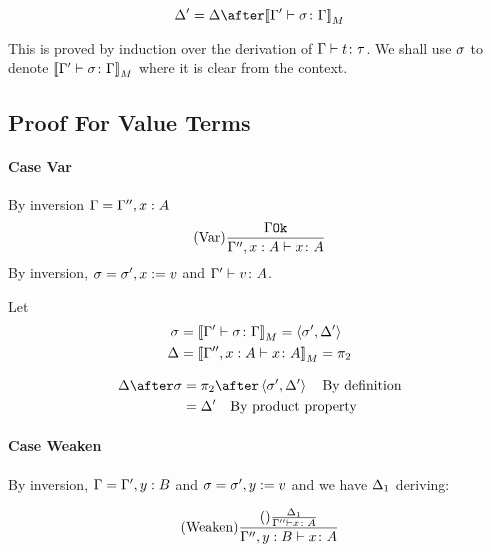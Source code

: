 \documentclass{report}
\begin{document}
\begin{equation}
    \D' = \D \after\deno{\typerelation{\G'}{\si}{\G}}
\end{equation}

This is proved by induction over the derivation of $\Gamma \vdash t \colon \tau$.
We shall use $\sigma$ to denote ${\bf [\![}\Gamma' \vdash \sigma \colon \Gamma{\bf ]\!]}_M$ where it is clear from the context.
\subsection{Proof For Value Terms}
\paragraph{Case Var}
By inversion $\Gamma = \Gamma'', x:A$
\begin{equation}
    (\text{Var}) \frac{\Gamma \texttt{Ok}}{\Gamma'', x:A \vdash x \colon A}
\end{equation}
By inversion, $\sigma = \sigma', x:= v$ and $\Gamma' \vdash v \colon A$.

Let 
\begin{align}
    \sigma &={\bf [\![}\Gamma' \vdash \sigma \colon \Gamma{\bf ]\!]}_M = \left\langle\sigma', \Delta'\right\rangle\\
    \Delta &={\bf [\![}\Gamma'', x:A \vdash x \colon A{\bf ]\!]}_M = \pi_2\\
\end{align}

\begin{align}
    \D\after\si &= \pp\after\pr{\si'}{\D'}\qt{By definition}\\
    &= \D'\qt{By product property}
\end{align}
\paragraph{Case Weaken}
By inversion, $\Gamma = \Gamma', y:B$ and $\sigma = \sigma', y:= v$
and we have $\Delta_1$ deriving:

\begin{equation}
    (\text{Weaken}) \frac{(\text{}) \frac{\Delta_1}{\Gamma'' \vdash x \colon A}}{\Gamma'',y: B \vdash x \colon A}
\end{equation}
\end{document}
